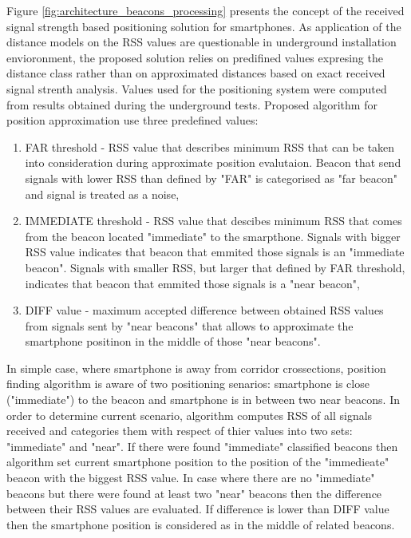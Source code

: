 \documentclass[../main.tex]{subfiles}
\begin{document}
Figure \ref{fig:architecture_beacons_processing} presents the concept of the received signal strength based positioning solution for smartphones. As application of the distance models on the RSS values are questionable in underground installation envioronment, the proposed solution relies on predifined values expresing the distance class rather than on approximated distances based on exact received signal strenth analysis. Values used for the positioning system were computed from results obtained during the underground tests. Proposed algorithm for position approximation use three predefined values:
\begin{enumerate}
	\item FAR threshold - RSS value that describes minimum RSS that can be taken into consideration during approximate position evalutaion. Beacon that send signals with lower RSS than defined by "FAR" is categorised as "far beacon" and signal is treated as a noise,
	\item IMMEDIATE threshold - RSS value that descibes minimum RSS that comes from the beacon located "immediate" to the smarpthone. Signals with bigger RSS value indicates that beacon that emmited those signals is an "immediate beacon". Signals with smaller RSS, but larger that defined by FAR threshold, indicates that beacon that emmited those signals is a "near beacon",
	\item DIFF value - maximum accepted difference between obtained RSS values from signals sent by "near beacons" that allows to approximate the smartphone positinon in the middle of those "near beacons".
\end{enumerate}

In simple case, where smartphone is away from corridor crossections, position finding algorithm is aware of two positioning senarios: smartphone is close ("immediate") to the beacon and smartphone is in between two near beacons. In order to determine current scenario, algorithm computes RSS of all signals received and categories them with respect of thier values into two sets: "immediate" and "near". If there were found "immediate" classified beacons then algorithm set current smartphone position to the position of the "immedieate" beacon with the biggest RSS value. In case where there are no "immediate" beacons but there were found at least two "near" beacons then the difference between their RSS values are evaluated. If difference is lower than DIFF value then the smartphone position is considered as in the middle of related beacons.
\end{document}
